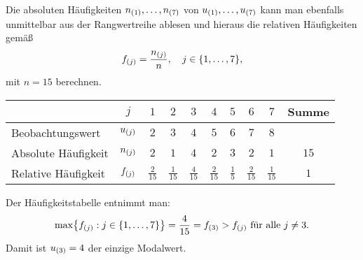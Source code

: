 \documentclass{exercise}
\begin{document}
\begin{enumerate}
        Die absoluten Häufigkeiten \(n_{\parentheses*{1}}, \ldots, n_{\parentheses*{7}}\) von \(u_{\parentheses*{1}}, \ldots, u_{\parentheses*{7}}\) kann man ebenfalls unmittelbar aus der Rangwertreihe ablesen und hieraus die relativen Häufigkeiten gemäß
        \[
            f_{\parentheses*{j}} = \frac{n_{\parentheses*{j}}}{n}, \quad j \in \braces*{1, \ldots, 7},
        \]
        mit \(n = 15\) berechnen.
        \begin{center}
            \begin{tabular}{lccccccccc}
                \toprule
                & \(j\) & \(1\) & \(2\) & \(3\) & \(4\) & \(5\) & \(6\) & \(7\) & Summe\\
                \midrule
                Beobachtungswert & \(u_{\parentheses*{j}}\) & \(2\) & \(3\) & \(4\) & \(5\) & \(6\) & \(7\) & \(8\) &\\
                Absolute Häufigkeit & \(n_{\parentheses*{j}}\) & \(2\) & \(1\) & \(4\) & \(2\) & \(3\) & \(2\) & \(1\) & \(15\)\\
                Relative Häufigkeit & \(f_{\parentheses*{j}}\) & \(\frac{2}{15}\) & \(\frac{1}{15}\) & \(\frac{4}{15}\) & \(\frac{2}{15}\) & \(\frac{1}{5}\) & \(\frac{2}{15}\) & \(\frac{1}{15}\) & \(1\)\\
                \bottomrule
            \end{tabular}
        \end{center}
        Der Häufigkeitstabelle entnimmt man:
        \[
            \max\braces*{f_{\parentheses*{j}} : j \in \braces*{1, \ldots, 7}} = \frac{4}{15} = f_{\parentheses*{3}} > f_{\parentheses*{j}}\text{ für alle }j \ne 3.
        \]
        Damit ist \(u_{\parentheses*{3}} = 4\) der einzige Modalwert.
    \end{enumerate}
\end{document}
